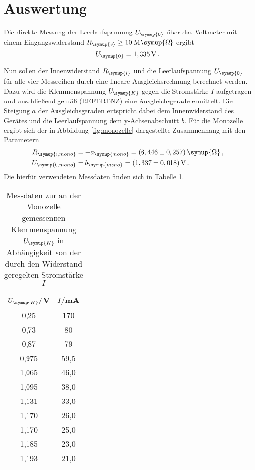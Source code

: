 \section{Auswertung}
\label{sec:Auswertung}

Die direkte Messung der Leerlaufspannung $U_{\symup{0}}$ über das Voltmeter
mit einem Eingangswiderstand $R_{\symup{v}}\geq10$\,M$\symup{\Omega}$ ergibt
\begin{equation}
  U_{\symup{0}}=1,335\,\text{V}\,.
\end{equation}


Nun sollen der Innenwiderstand $R_{\symup{i}}$ und die Leerlaufspannung $U_{\symup{0}}$
für alle vier Messreihen durch eine lineare Ausgleichsrechnung berechnet werden.
Dazu wird die Klemmenspannung $U_{\symup{K}}$ gegen die Stromstärke $I$ aufgetragen
und anschließend gemäß (REFERENZ) eine Ausgleichsgerade ermittelt.
Die Steigung $a$ der Ausgleichsgeraden entspricht dabei dem Innenwiderstand des
Gerätes und die Leerlaufspannung dem y-Achsenabschnitt $b$. Für die Monozelle
ergibt sich der in Abbildung \ref{fig:monozelle} dargestellte Zusammenhang mit den
Parametern
\begin{align}
  R_{\symup{i,mono}}&=-a_{\symup{mono}}=(6,446\pm0,257)\,\symup{\Omega} \,, \\
  U_{\symup{0,mono}}&=b_{\symup{mono}}=(1,337\pm0,018)\,\text{V}\,.
\end{align}
Die hierfür verwendeten Messdaten finden sich in Tabelle \ref{tab:monozelle}.

\begin{table}
  \centering
  \caption{Messdaten zur an der Monozelle gemessennen Klemmenspannung $U_{\symup{K}}$
  in Abhängigkeit von der durch den Widerstand geregelten Stromstärke $I$}
  \label{tab:monozelle}
  \begin{tabular}{c c}
    \toprule
    $U_{\symup{K}}/$V & $I/$mA\\
    \midrule
    0,25	&  170\\
    0,73	&  80\\
    0,87	&  79\\
    0,975	& 59,5\\
    1,065	& 46,0\\
    1,095	& 38,0\\
    1,131	& 33,0\\
    1,170	& 26,0\\
    1,170	& 25,0\\
    1,185	& 23,0\\
    1,193	& 21,0\\
    \bottomrule
  \end{tabular}
\end{table}

